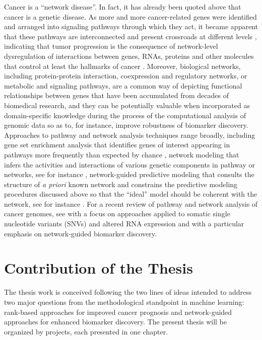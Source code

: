 Cancer is a ``network disease''. In fact, it has already been quoted above that cancer is a genetic disease. As more and more cancer-related genes were identified and arranged into signaling pathways through which they act, it became apparent that these pathways are interconnected and present crossroads at different levels \cite{Vogelstein2004Cancer}, indicating that tumor progression is the consequence of network-level dysregulation of interactions between genes, RNAs, proteins and other molecules that control at least the hallmarks of cancer \cite{Hanahan2011Hallmarks}. Moreover, biological networks, including protein-protein interaction, coexpression and regulatory networks, or metabolic and signaling pathways, are a common way of depicting functional relationships between genes that have been accumulated from decades of biomedical research, and they can be potentially valuable when incorporated as domain-specific knowledge during the process of the computational analysis of genomic data so as to, for instance, improve robustness of biomarker discovery. Approaches to pathway and network analysis techniques range broadly, including gene set enrichment analysis that identifies genes of interest appearing in pathways more frequently than expected by chance \cite{Subramanian2005Gene}, network modeling that infers the activities and interactions of various genetic components in pathway or networks, see for instance \cite{Tarca2008novel, Drier2013Pathway, Vandin2011Algorithms, Hidalgo2017High}, network-guided predictive modeling that consults the structure of \textit{a priori} known network and constrains the predictive modeling procedures discussed above so that the ``ideal'' model should be coherent with the network, see for instance \cite{Li2010Variable, Rapaport2007Classification, Jacob2009Group}. For a recent review of pathway and network analysis of cancer genomes, see \cite{Creixell2015Pathway} with a focus on approaches applied to somatic single nucleotide variants (SNVs) and altered RNA expression and \cite{Azencott2016Network} with a particular emphasis on network-guided biomarker discovery.




\section{Contribution of the Thesis}

The thesis work is conceived following the two lines of ideas intended to address two major questions from the methodological standpoint in machine learning: rank-based approaches for improved cancer prognosis and network-guided approaches for enhanced biomarker discovery. The present thesis will be organized by projects, each presented in one chapter.

